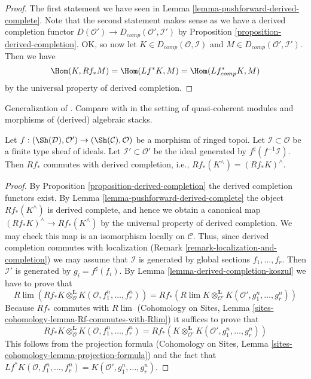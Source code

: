 \begin{proof}
The first statement we have seen in
Lemma \ref{lemma-pushforward-derived-complete}.
Note that the second statement makes sense as we have a derived
completion functor $D(\mathcal{O}') \to D_{comp}(\mathcal{O}', \mathcal{I}')$
by Proposition \ref{proposition-derived-completion}.
OK, so now let $K \in D_{comp}(\mathcal{O}, \mathcal{I})$
and $M \in D_{comp}(\mathcal{O}', \mathcal{I}')$. Then we have
$$
\Hom(K, Rf_*M) = \Hom(Lf^*K, M) = \Hom(Lf_{comp}^*K, M)
$$
by the universal property of derived completion.
\end{proof}

\begin{lemma}
\label{lemma-pushforward-commutes-with-derived-completion}
\begin{reference}
Generalization of \cite[Lemma 6.5.9 (2)]{BS}. Compare with
\cite[Theorem 6.5]{HL-P} in the setting of quasi-coherent modules
and morphisms of (derived) algebraic stacks.
\end{reference}
Let $f : (\Sh(\mathcal{D}), \mathcal{O}') \to (\Sh(\mathcal{C}), \mathcal{O})$
be a morphism of ringed topoi. Let $\mathcal{I} \subset \mathcal{O}$
be a finite type sheaf of ideals. Let $\mathcal{I}' \subset \mathcal{O}'$
be the ideal generated by $f^\sharp(f^{-1}\mathcal{I})$.
Then $Rf_*$ commutes with derived completion, i.e.,
$Rf_*(K^\wedge) = (Rf_*K)^\wedge$.
\end{lemma}

\begin{proof}
By Proposition \ref{proposition-derived-completion} the derived completion
functors exist. By Lemma \ref{lemma-pushforward-derived-complete} the object
$Rf_*(K^\wedge)$ is derived complete, and hence we obtain a canonical map
$(Rf_*K)^\wedge \to Rf_*(K^\wedge)$ by the universal property of derived
completion. We may check this map is an isomorphism locally on $\mathcal{C}$.
Thus, since derived completion commutes with localization
(Remark \ref{remark-localization-and-completion}) we may assume
that $\mathcal{I}$ is generated by global sections $f_1, \ldots, f_r$.
Then $\mathcal{I}'$ is generated by $g_i = f^\sharp(f_i)$. By
Lemma \ref{lemma-derived-completion-koszul}
we have to prove that
$$
R\lim \left(
Rf_*K \otimes^\mathbf{L}_\mathcal{O} K(\mathcal{O}, f_1^n, \ldots, f_r^n)
\right)
=
Rf_*\left(
R\lim
K \otimes^\mathbf{L}_{\mathcal{O}'} K(\mathcal{O}', g_1^n, \ldots, g_r^n)
\right)
$$
Because $Rf_*$ commutes with $R\lim$
(Cohomology on Sites, Lemma
\ref{sites-cohomology-lemma-Rf-commutes-with-Rlim})
it suffices to prove that
$$
Rf_*K \otimes^\mathbf{L}_\mathcal{O} K(\mathcal{O}, f_1^n, \ldots, f_r^n) =
Rf_*\left(
K \otimes^\mathbf{L}_{\mathcal{O}'} K(\mathcal{O}', g_1^n, \ldots, g_r^n)
\right)
$$
This follows from the projection formula (Cohomology on Sites, Lemma
\ref{sites-cohomology-lemma-projection-formula}) and the fact that
$Lf^*K(\mathcal{O}, f_1^n, \ldots, f_r^n) =
K(\mathcal{O}', g_1^n, \ldots, g_r^n)$.
\end{proof}

